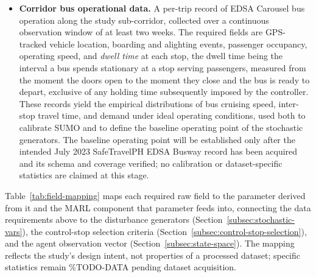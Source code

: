 \iffalse
\begin{itemize}

\item \textbf{Corridor bus operational data.} A per-trip record of EDSA Carousel bus operation along the study sub-corridor, collected over a continuous observation window of at least two weeks. The required fields are GPS-tracked vehicle location, boarding and alighting events, passenger occupancy, operating speed, and \textit{dwell time} at each stop, the dwell time being the interval a bus spends stationary at a stop serving passengers, measured from the moment the doors open to the moment they close and the bus is ready to depart, exclusive of any holding time subsequently imposed by the controller. These records yield the empirical distributions of bus cruising speed, inter-stop travel time, and demand under ideal operating conditions, used both to calibrate SUMO and to define the baseline operating point of the stochastic generators. The baseline operating point will be established only after the intended July 2023 SafeTravelPH EDSA Busway record has been acquired and its schema and coverage verified; no calibration or dataset-specific statistics are claimed at this stage.


\end{itemize}

Table~\ref{tab:field-mapping} maps each required raw field to the parameter derived from it and the MARL component that parameter feeds into, connecting the data requirements above to the disturbance generators (Section~\ref{subsec:stochastic-vars}), the control-stop selection criteria (Section~\ref{subsec:control-stop-selection}), and the agent observation vector (Section~\ref{subsec:state-space}). The mapping reflects the study's design intent, not properties of a processed dataset; specific statistics remain \%TODO-DATA pending dataset acquisition.


